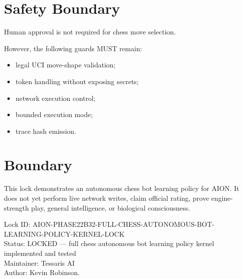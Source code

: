 \documentclass[11pt,a4paper]{article}
\begin{document}
\section{Safety Boundary}

Human approval is not required for chess move selection.

However, the following guards MUST remain:

\begin{itemize}
  \item legal UCI move-shape validation;
  \item token handling without exposing secrets;
  \item network execution control;
  \item bounded execution mode;
  \item trace hash emission.
\end{itemize}

\section{Boundary}

This lock demonstrates an autonomous chess bot learning policy for AION. It does not yet perform live network writes, claim official rating, prove engine-strength play, general intelligence, or biological consciousness.

\bigskip

\noindent
Lock ID: AION-PHASE22B32-FULL-CHESS-AUTONOMOUS-BOT-LEARNING-POLICY-KERNEL-LOCK\\
Status: LOCKED --- full chess autonomous bot learning policy kernel implemented and tested\\
Maintainer: Tessaris AI\\
Author: Kevin Robinson.
\end{document}

